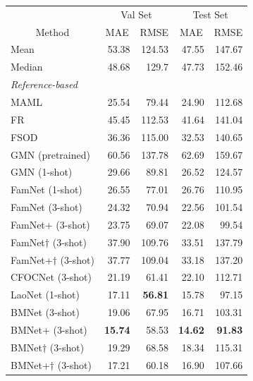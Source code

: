 
\begin{tabular}{lrrrr}
 \toprule
 & \multicolumn{2}{c}{Val Set} & \multicolumn{2}{c}{Test Set} \\
\multicolumn{1}{c}{Method} & \multicolumn{1}{c}{MAE} & \multicolumn{1}{c}{RMSE} & \multicolumn{1}{c}{MAE} & \multicolumn{1}{c}{RMSE} \\

\midrule
Mean & 53.38 & 124.53 & 47.55 & 147.67 \\
Median & 48.68 & 129.7 & 47.73 & 152.46 \\
\midrule
\textit{Reference-based} & & & & \\
MAML 
\cite{finn2017model}
& 25.54 & 79.44 & 24.90 & 112.68 \\
FR 
\cite{kang2019few}
& 45.45 & 112.53 & 41.64 & 141.04 \\
FSOD 
\cite{fan2020few}
& 36.36 & 115.00 & 32.53 & 140.65 \\
GMN (pretrained) 
\cite{Lu18}
& 60.56 & 137.78 & 62.69 & 159.67 \\
GMN 
 \cite{Lu18} \hfill (1-shot) 
& 29.66 & 89.81 & 26.52 & 124.57 \\
FamNet 
 \cite{ranjan2021Famnet} \hfill (1-shot) 
& 26.55 & 77.01 & 26.76 & 110.95 \\
FamNet 
 \cite{ranjan2021Famnet} \hfill (3-shot) 
& 24.32 & 70.94 & 22.56 & 101.54 \\
FamNet+ 
 \cite{ranjan2021Famnet} \hfill (3-shot) 
& 23.75 & 69.07 & 22.08 & 99.54 \\
FamNet$\dag$  \cite{ranjan2021Famnet} \hfill (3-shot) & 37.90 &  109.76 & 33.51  & 137.79  \\
FamNet+$\dag$  \cite{ranjan2021Famnet} \hfill (3-shot) & 37.77 & 109.04 &  33.18 & 137.20
 \\
CFOCNet \cite{yang2021cfoc}
\hfill (3-shot) 
& 21.19 & 61.41 & 22.10 & 112.71  \\
LaoNet \cite{lin2021object}
\hfill (1-shot) 
& 17.11 & \textbf{56.81} & 15.78 & 97.15 \\
BMNet 
  \cite{shi2022represent} \hfill (3-shot) 
& 19.06 & 67.95 & 16.71 & 103.31  \\
BMNet+  \cite{shi2022represent} \hfill (3-shot) 
& \textbf{15.74} & 58.53 & \textbf{14.62} & \textbf{91.83} \\
BMNet$\dag$ 
 \cite{shi2022represent} \hfill (3-shot) 
& 19.29  & 68.58 & 18.34  & 115.31  \\
BMNet+$\dag$  
 \cite{shi2022represent} \hfill (3-shot) 
& 17.21 & 60.18 & 16.90 & 107.66  \\

\end{tabular}
